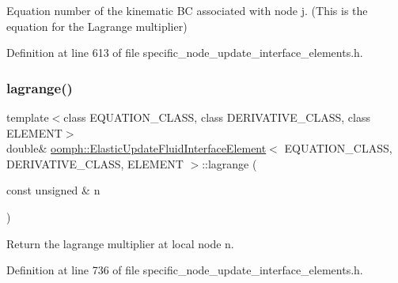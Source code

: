 Equation number of the kinematic BC associated with node j. (This is the equation for the Lagrange multiplier) 



Definition at line 613 of file specific\+\_\+node\+\_\+update\+\_\+interface\+\_\+elements.\+h.

\mbox{\label{classoomph_1_1ElasticUpdateFluidInterfaceElement_a8b5c5b703e6daafbe1dcafd3fe93e537}} 
\subsubsection{\texorpdfstring{lagrange()}{lagrange()}}
{\footnotesize\ttfamily template$<$class E\+Q\+U\+A\+T\+I\+O\+N\+\_\+\+C\+L\+A\+SS, class D\+E\+R\+I\+V\+A\+T\+I\+V\+E\+\_\+\+C\+L\+A\+SS, class E\+L\+E\+M\+E\+NT$>$ \\
double\& \hyperlink{classoomph_1_1ElasticUpdateFluidInterfaceElement}{oomph\+::\+Elastic\+Update\+Fluid\+Interface\+Element}$<$ E\+Q\+U\+A\+T\+I\+O\+N\+\_\+\+C\+L\+A\+SS, D\+E\+R\+I\+V\+A\+T\+I\+V\+E\+\_\+\+C\+L\+A\+SS, E\+L\+E\+M\+E\+NT $>$\+::lagrange (\begin{DoxyParamCaption}\item[{const unsigned \&}]{n }\end{DoxyParamCaption})\hspace{0.3cm}{\ttfamily [inline]}}



Return the lagrange multiplier at local node n. 



Definition at line 736 of file specific\+\_\+node\+\_\+update\+\_\+interface\+\_\+elements.\+h.

\mbox{\label{classoomph_1_1ElasticUpdateFluidInterfaceElement_a2eb4fbe50ac4ff1e9b26e0e1d8ff3186}} 
